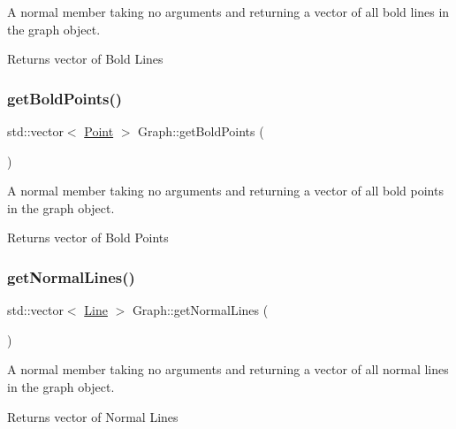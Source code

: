 A normal member taking no arguments and returning a vector of all bold lines in the graph object. 

\begin{DoxyReturn}{Returns}
vector of Bold Lines 
\end{DoxyReturn}
\mbox{\label{class_graph_a67eada6ad6ec40b460f143d6abc96fdd}} 
\subsubsection{\texorpdfstring{getBoldPoints()}{getBoldPoints()}}
{\footnotesize\ttfamily std\+::vector$<$ \mbox{\hyperlink{struct_point}{Point}} $>$ Graph\+::get\+Bold\+Points (\begin{DoxyParamCaption}{ }\end{DoxyParamCaption})}



A normal member taking no arguments and returning a vector of all bold points in the graph object. 

\begin{DoxyReturn}{Returns}
vector of Bold Points 
\end{DoxyReturn}
\mbox{\label{class_graph_a669b5fbc123b65cdbbf823ecb0b1f157}} 
\subsubsection{\texorpdfstring{getNormalLines()}{getNormalLines()}}
{\footnotesize\ttfamily std\+::vector$<$ \mbox{\hyperlink{struct_line}{Line}} $>$ Graph\+::get\+Normal\+Lines (\begin{DoxyParamCaption}{ }\end{DoxyParamCaption})}



A normal member taking no arguments and returning a vector of all normal lines in the graph object. 

\begin{DoxyReturn}{Returns}
vector of Normal Lines 
\end{DoxyReturn}
\mbox{\label{class_graph_aec8ff38cf9e5628827899cc1eee5c9b3}} 
